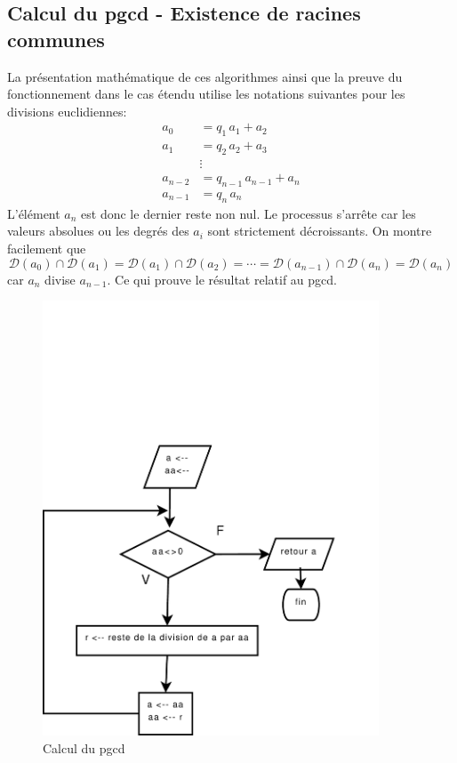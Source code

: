 \subsection{Calcul du pgcd - Existence de racines communes}
La présentation mathématique de ces algorithmes ainsi que la preuve du fonctionnement dans le cas étendu utilise les notations suivantes pour les divisions euclidiennes:
\begin{align*}
 a_0 &= q_1\,a_1 + a_2 \\
a_1 &= q_2\,a_2 + a_3 \\
   &\vdots \\
a_{n-2} &= q_{n-1}\,a_{n-1} +a_n\\
a_{n-1} &= q_n \, a_n
\end{align*}
L'élément $a_n$ est donc le dernier reste non nul. Le processus s'arrête car les valeurs absolues ou les degrés des $a_i$ sont strictement décroissants. \newline
On montre facilement que 
\begin{displaymath}
 \mathcal D (a_0)\cap \mathcal D (a_1) = \mathcal D (a_1)\cap \mathcal D (a_2) = \cdots = \mathcal D (a_{n-1})\cap \mathcal D (a_n) = \mathcal D (a_n) 
\end{displaymath}
car $a_n$ divise $a_{n-1}$. Ce qui prouve le résultat relatif au pgcd.
\begin{figure}[ht]
 \centering
 \includegraphics[width=10cm]{C5546_2.pdf}
 \caption{Calcul du pgcd}
 \label{C5546_2}
\end{figure}


